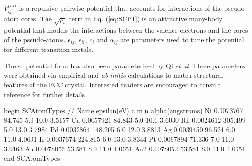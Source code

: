 \documentclass[]{book}
\begin{document}
$V^{pair}_{ij}$ is a repulsive pairwise potential that accounts for
interactions of the pseudo-atom cores.  The $\sqrt{\rho_i}$ term in
Eq. (\ref{eq:SCP1}) is an attractive many-body potential that models
the interactions between the valence electrons and the cores of the
pseudo-atoms.  $\epsilon_{ij}$, $\epsilon_{ii}$, $c_i$ and
$\alpha_{ij}$ are parameters used to tune the potential for different
transition metals.

The {\sc sc} potential form has also been parameterized by Qi {\it et
al.}\cite{Qi99} These parameters were obtained via empirical and {\it
ab initio} calculations to match structural features of the FCC
crystal.  Interested readers are encouraged to consult reference
\citealp{Qi99} for further details.

\begin{code}[caption={[An example of a SCAtomTypes block.] A
simple example of a SCAtomTypes block.  Distances ($\alpha$)
are given in \AA\ and energies ($\epsilon$) are (by convention) given in
units of eV.  These units must be specified in the {\tt Options} block
using the keyword {\tt MetallicEnergyUnitScaling}.  Without this {\tt
Options} keyword, the default units for $\epsilon$ are kcal/mol.  The
other parameters, $m$, $n$, and $c$ are unitless.},
label={sch:SCAtomTypes}]
begin SCAtomTypes
// Name  epsilon(eV)      c      m       n      alpha(angstroms)
Ni      0.0073767       84.745  5.0     10.0    3.5157 
Cu      0.0057921       84.843  5.0     10.0    3.6030
Rh      0.0024612       305.499 5.0     13.0    3.7984
Pd      0.0032864       148.205 6.0     12.0    3.8813
Ag      0.0039450       96.524  6.0     11.0    4.0691
Ir      0.0037674       224.815 6.0     13.0    3.8344  
Pt      0.0097894       71.336  7.0     11.0    3.9163
Au      0.0078052       53.581  8.0     11.0    4.0651
Au2     0.0078052       53.581  8.0     11.0    4.0651
end SCAtomTypes
\end{code}
\end{document}
